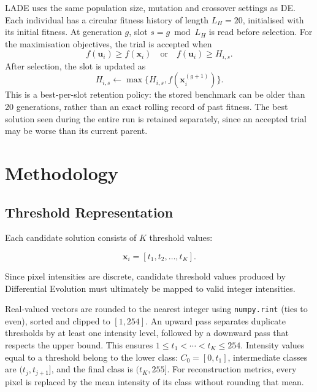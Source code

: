 \documentclass[review]{elsarticle}
\begin{document}
LADE uses the same population size, mutation and crossover settings as DE.
Each individual has a circular fitness history of length $L_H=20$,
initialised with its initial fitness. At generation $g$, slot
$s=g\bmod L_H$ is read before selection. For the maximisation objectives,
the trial is accepted when
\begin{equation}
f(\mathbf{u}_i)\geq f(\mathbf{x}_i)
\quad\text{or}\quad f(\mathbf{u}_i)\geq H_{i,s}.
\end{equation}
After selection, the slot is updated as
\begin{equation}
H_{i,s}\leftarrow\max\{H_{i,s},f(\mathbf{x}_i^{(g+1)})\}.
\end{equation}
This is a best-per-slot retention policy: the stored benchmark can be
older than 20 generations, rather than an exact rolling record of past
fitness. The best solution seen during the entire run is retained
separately, since an accepted trial may be worse than its current parent.





\section{Methodology}
\label{sec:methodology}


\subsection{Threshold Representation}

Each candidate solution consists of $K$ threshold values:

\begin{equation}
\mathbf{x}_i =
[t_1,t_2,\ldots,t_K].
\end{equation}

Since pixel intensities are discrete, candidate threshold values produced
by Differential Evolution must ultimately be mapped to valid integer
intensities.

Real-valued vectors are rounded to the nearest integer using
\texttt{numpy.rint} (ties to even), sorted and clipped to $[1,254]$.
An upward pass separates duplicate thresholds by at least one intensity
level, followed by a downward pass that respects the upper bound.
This ensures $1\leq t_1<\cdots<t_K\leq254$. Intensity values equal to a
threshold belong to the lower class: $C_0=[0,t_1]$, intermediate classes
are $(t_j,t_{j+1}]$, and the final class is $(t_K,255]$.
For reconstruction metrics, every pixel is replaced by the mean intensity
of its class without rounding that mean.
\end{document}
